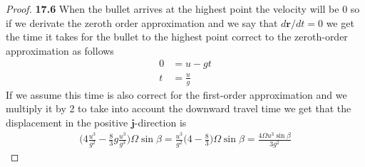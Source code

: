 \documentclass[11pt]{article}
\theoremstyle{definition}
\begin{document}
\begin{proof}{\textbf{17.6}}
    When the bullet arrives at the highest point the velocity will be $0$ so
    if we derivate the zeroth order approximation and we say that
    $d\bm{r}/dt = 0$ we get the time it takes for the bullet to 
    the highest point correct to the zeroth-order approximation as follows
    \begin{align*}
        0 &= u - gt\\
        t &= \frac{u}{g}
    \end{align*}
    If we assume this time is also correct for the first-order approximation
    and we multiply it by 2 to take into account the downward travel time we
    get that the displacement in the positive $\bm{j}$-direction is
    \begin{align*}
        \bigg(4\frac{u^3}{g^2} - \frac{8}{3}g\frac{u^3}{g^3}\bigg)
        \Omega\sin\beta =
        \frac{u^3}{g^2}\bigg(4 - \frac{8}{3}\bigg)\Omega\sin\beta =
        \frac{4\Omega u^3\sin\beta}{3g^2}
    \end{align*}
\end{proof}
\cleardoublepage
\end{document}
